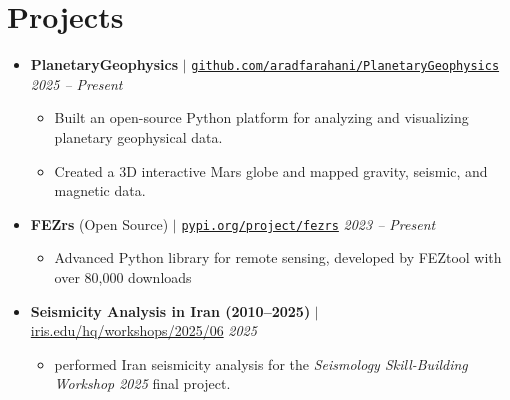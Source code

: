 \documentclass[letterpaper,11pt]{article}
\begin{document}
	\section{Projects}
					\vspace{-0.8em}
	\begin{itemize}[left=0pt, label={}, topsep=7.5pt, partopsep=0pt, itemsep=6pt, parsep=0pt]
		\item \textbf{PlanetaryGeophysics} $|$ \normalfont\href{https://github.com/aradfarahani/PlanetaryGeophysics/}{\texttt{github.com/aradfarahani/PlanetaryGeophysics}} \hfill \textit{2025 – Present}
		\begin{itemize}[left=15pt, label=\textbullet, topsep=4pt, partopsep=0pt, itemsep=3pt, parsep=0pt]
			\item Built an open-source Python platform for analyzing and visualizing planetary geophysical data.
			\item Created a 3D interactive Mars globe and mapped gravity, seismic, and magnetic data.
			
		\end{itemize}
	\end{itemize}
					\vspace{-1.4em}
	\begin{itemize}[left=0pt, label={}, topsep=7.5pt, partopsep=0pt, itemsep=6pt, parsep=0pt]
		\item \textbf{FEZrs} (Open Source) $|$ \normalfont\href{https://pypi.org/project/fezrs/}{\texttt{pypi.org/project/fezrs}} \hfill \textit{2023 – Present}
		\begin{itemize}[left=15pt, label=\textbullet, topsep=4pt, partopsep=0pt, itemsep=3pt, parsep=0pt]
			\item Advanced Python library for remote sensing, developed by FEZtool with over 80,000 downloads
		\end{itemize}
		
	\end{itemize}
					\vspace{-1.2em}
\begin{itemize}[left=0pt, label={}, topsep=7.5pt, partopsep=0pt, itemsep=6pt, parsep=0pt]
	\item \textbf{Seismicity Analysis in Iran (2010–2025)} $|$ 
	\normalfont\href{https://nbviewer.org/urls/www.iris.edu/hq/files/short_courses/2020/ssb/iran_seismicity_analysis1.ipynb}
	{iris.edu/hq/workshops/2025/06} \hfill \textit{2025}
	
	\begin{itemize}[left=15pt, label=\textbullet, topsep=4pt, partopsep=0pt, itemsep=3pt, parsep=0pt]
		\item performed Iran seismicity analysis for the \textit{Seismology Skill-Building Workshop 2025} final project.
	\end{itemize}
\end{itemize}
\end{document}
